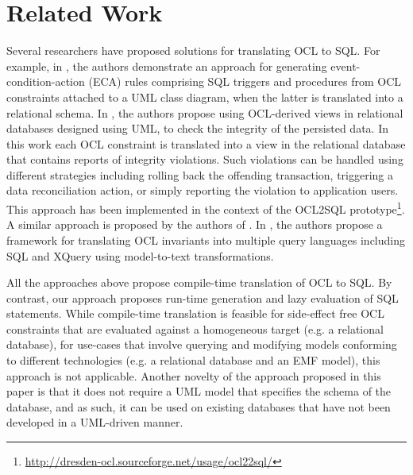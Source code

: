 \section{Related Work}
\label{sec:background}

Several researchers have proposed solutions for translating OCL to SQL. For example, in \cite{Berrabah2007}, the authors demonstrate an approach for generating event-condition-action (ECA) rules comprising SQL triggers and procedures from OCL constraints attached to a UML class diagram, when the latter is translated into a relational schema. In \cite{Demuth2001}, the authors propose using OCL-derived views in relational databases designed using UML, to check the integrity of the persisted data. In this work each OCL constraint is translated into a view in the relational database that contains reports of integrity violations. Such violations can be handled using different strategies including rolling back the offending transaction, triggering a data reconciliation action, or simply reporting the violation to application users. This approach has been implemented in the context of the OCL2SQL prototype\footnote{\url{http://dresden-ocl.sourceforge.net/usage/ocl22sql/}}. A similar approach is proposed by the authors of \cite{Marder2009}. In \cite{Heidenreich2007}, the authors propose a framework for translating OCL invariants into multiple query languages including SQL and XQuery using model-to-text transformations.

All the approaches above propose compile-time translation of OCL to SQL. By contrast, our approach proposes run-time generation and lazy evaluation of SQL statements. While compile-time translation is feasible for side-effect free OCL constraints that are evaluated against a homogeneous target (e.g. a relational database), for use-cases that involve querying and modifying models conforming to different technologies (e.g. a relational database and an EMF model), this approach is not applicable. Another novelty of the approach proposed in this paper is that it does not require a UML model that specifies the schema of the database, and as such, it can be used on existing databases that have not been developed in a UML-driven manner.